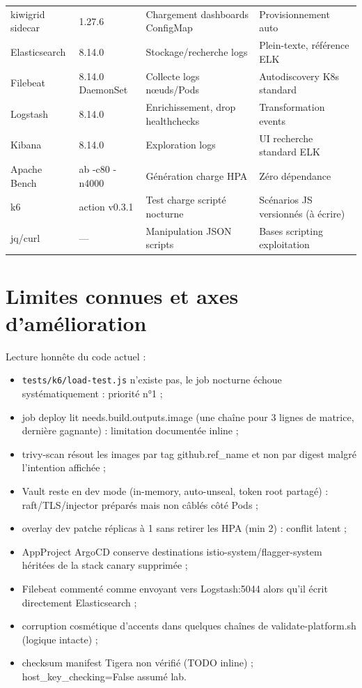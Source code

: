 \documentclass[12pt,a4paper,twoside,openright]{report}
\begin{document}
{\begin{longtable}{@{}p{3.0cm}p{1.9cm}p{4.7cm}p{4.7cm}@{}}
kiwigrid sidecar & 1.27.6 & Chargement dashboards ConfigMap & Provisionnement auto \\
Elasticsearch & 8.14.0 & Stockage/recherche logs & Plein-texte, référence ELK \\
Filebeat & 8.14.0 DaemonSet & Collecte logs nœuds/Pods & Autodiscovery K8s standard \\
Logstash & 8.14.0 & Enrichissement, drop healthchecks & Transformation events \\
Kibana & 8.14.0 & Exploration logs & UI recherche standard ELK \\
Apache Bench & ab -c80 -n4000 & Génération charge HPA & Zéro dépendance \\
k6 & action v0.3.1 & Test charge scripté nocturne & Scénarios JS versionnés (à écrire) \\
jq/curl & --- & Manipulation JSON scripts & Bases scripting exploitation \\
\bottomrule
\end{longtable}
}

\clearpage
\section{Limites connues et axes d'amélioration}

Lecture honnête du code actuel :
\begin{itemize}[itemsep=2pt]
  \item \texttt{tests/k6/load-test.js} n'existe pas, le job nocturne échoue systématiquement : priorité n°1 ;
  \item job deploy lit needs.build.outputs.image (une chaîne pour 3 lignes de matrice, dernière gagnante) : limitation documentée inline ;
  \item trivy-scan résout les images par tag github.ref\_name et non par digest malgré l'intention affichée ;
  \item Vault reste en dev mode (in-memory, auto-unseal, token root partagé) : raft/TLS/injector préparés mais non câblés côté Pods ;
  \item overlay dev patche réplicas à 1 sans retirer les HPA (min 2) : conflit latent ;
  \item AppProject ArgoCD conserve destinations istio-system/flagger-system héritées de la stack canary supprimée ;
  \item Filebeat commenté comme envoyant vers Logstash:5044 alors qu'il écrit directement Elasticsearch ;
  \item corruption cosmétique d'accents dans quelques chaînes de validate-platform.sh (logique intacte) ;
  \item checksum manifest Tigera non vérifié (TODO inline) ; host\_key\_checking=False assumé lab.
\end{itemize}
\end{document}
